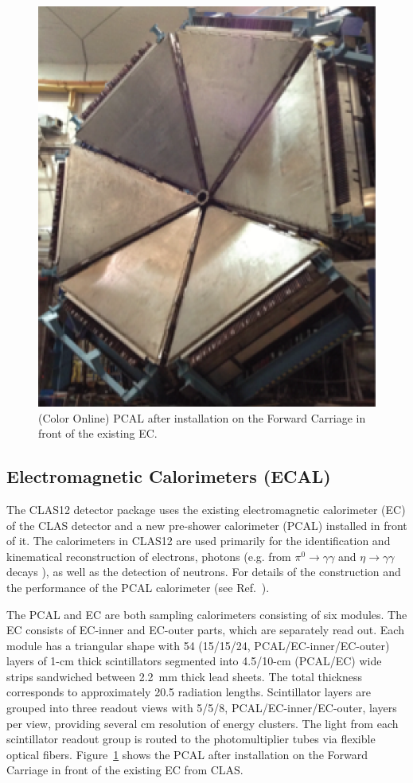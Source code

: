 \documentclass[final,3p,twocolumn]{elsarticle}
\begin{document}
\begin{figure}[htbp!]
\centerline{\includegraphics[width=0.95\columnwidth]{PCAL.png}}
\caption{(Color Online) PCAL after installation on the Forward Carriage in front of the existing EC. }
\label{ec-pcal}
\end{figure}

\subsection{Electromagnetic Calorimeters (ECAL)}

The CLAS12 detector package uses the existing electromagnetic calorimeter (EC) of the CLAS detector
\cite{Amarian:2001zs} and a new pre-shower calorimeter (PCAL) installed in front of it. The calorimeters in
CLAS12 are used primarily for the identification and kinematical reconstruction of electrons, photons (e.g. from
$\pi^0 \to \gamma \gamma$ and $\eta \to \gamma  \gamma$ decays ), as well as the detection of neutrons.
For details of the construction and the performance of the PCAL calorimeter (see Ref.~\cite{ECAL}). 

The PCAL and EC are both sampling calorimeters consisting of six modules. The EC consists of EC-inner and
EC-outer parts, which are separately read out. Each module has a triangular shape with 54 (15/15/24,
PCAL/EC-inner/EC-outer) layers of 1-cm thick scintillators segmented into 4.5/10-cm (PCAL/EC) wide strips
sandwiched between 2.2~mm thick lead sheets. The total thickness corresponds to approximately 20.5 radiation
lengths. Scintillator layers are grouped into three readout views with 5/5/8, PCAL/EC-inner/EC-outer, layers per
view, providing several cm resolution of energy clusters. The light from each scintillator readout group is routed to
the photomultiplier tubes via flexible optical fibers. Figure~\ref{ec-pcal} shows the PCAL after installation on the
Forward Carriage in front of the existing EC from CLAS.
\end{document}

